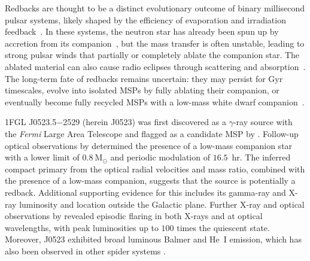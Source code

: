 Redbacks are thought to be a distinct evolutionary outcome of binary millisecond pulsar systems, likely shaped by the efficiency of evaporation and irradiation feedback~\citep{chen2013, devito2020}. In these systems, the neutron star has already been spun up by accretion from its companion~\citep{th06}, but the mass transfer is often unstable, leading to strong pulsar winds that partially or completely ablate the companion star. The ablated material can also cause radio eclipses through scattering and absorption~\citep{broderick_low-radio-frequency_2016}. The long-term fate of redbacks remains uncertain: they may persist for Gyr timescales, evolve into isolated MSPs by fully ablating their companion, or eventually become fully recycled MSPs with a low-mass white dwarf companion~\citep{chen2013, zanon_evidence_2021}.

1FGL J0523.5$-$2529 (herein J0523) was first discovered as a $\gamma$-ray source with the \textit{Fermi} Large Area Telescope \citep[LAT;][]{abdo_second_2013} and flagged as a candidate MSP by \citet{ackermann_statistical_2012}. Follow-up optical observations by \citet{strader_1fgl_2014} determined the presence of a low-mass companion star with a lower limit of $0.8~\text{M}_\odot$ and periodic modulation of $16.5$~hr. The inferred compact primary from the optical radial velocities and mass ratio, combined with the presence of a low-mass companion, suggests that the source is potentially a redback. Additional supporting evidence for this includes its gamma-ray and X-ray luminosity and location outside the Galactic plane. Further X-ray and optical observations by \citet{halpern_luminous_2022} revealed episodic flaring in both X-rays and at optical wavelengths, with peak luminosities up to $100$ times the quiescent state. Moreover, J0523 exhibited broad luminous Balmer and He~I emission, which has also been observed in other spider systems \citep{strader_1fgl_2014}.


